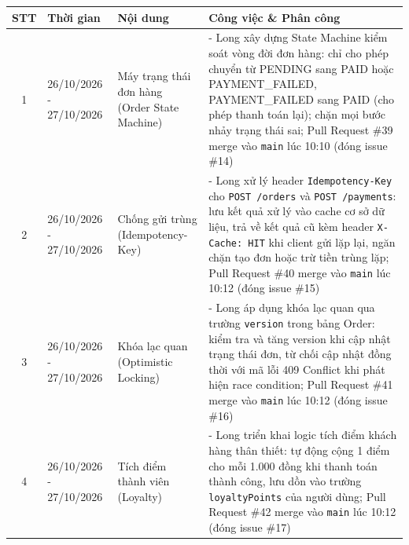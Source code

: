 \documentclass[12pt, a4paper]{article}
\begin{document}
\begin{tabularx}{\textwidth}{|c|p{3.2cm}|Y|Y|}
    \hline
    \textbf{STT} & \textbf{Thời gian} & \textbf{Nội dung} & \textbf{Công việc \& Phân công} \\
    \hline

    1 & 26/10/2026 - 27/10/2026 & Máy trạng thái đơn hàng (Order State Machine) &
    - Long xây dựng State Machine kiểm soát vòng đời đơn hàng: chỉ cho phép chuyển từ PENDING sang PAID hoặc PAYMENT\_FAILED, PAYMENT\_FAILED sang PAID (cho phép thanh toán lại); chặn mọi bước nhảy trạng thái sai; Pull Request \#39 merge vào \texttt{main} lúc 10:10 (đóng issue \#14) \\
    \hline

    2 & 26/10/2026 - 27/10/2026 & Chống gửi trùng (Idempotency-Key) &
    - Long xử lý header \texttt{Idempotency-Key} cho \texttt{POST /orders} và \texttt{POST /payments}: lưu kết quả xử lý vào cache cơ sở dữ liệu, trả về kết quả cũ kèm header \texttt{X-Cache: HIT} khi client gửi lặp lại, ngăn chặn tạo đơn hoặc trừ tiền trùng lặp; Pull Request \#40 merge vào \texttt{main} lúc 10:12 (đóng issue \#15) \\
    \hline

    3 & 26/10/2026 - 27/10/2026 & Khóa lạc quan (Optimistic Locking) &
    - Long áp dụng khóa lạc quan qua trường \texttt{version} trong bảng Order: kiểm tra và tăng version khi cập nhật trạng thái đơn, từ chối cập nhật đồng thời với mã lỗi 409 Conflict khi phát hiện race condition; Pull Request \#41 merge vào \texttt{main} lúc 10:12 (đóng issue \#16) \\
    \hline

    4 & 26/10/2026 - 27/10/2026 & Tích điểm thành viên (Loyalty) &
    - Long triển khai logic tích điểm khách hàng thân thiết: tự động cộng 1 điểm cho mỗi 1.000 đồng khi thanh toán thành công, lưu dồn vào trường \texttt{loyaltyPoints} của người dùng; Pull Request \#42 merge vào \texttt{main} lúc 10:12 (đóng issue \#17) \\
    \hline
\end{tabularx}

\vspace{0.8cm}
\end{document}
